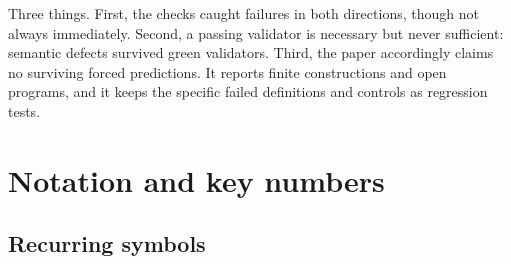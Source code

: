 \documentclass[11pt]{article}
\theoremstyle{definition}
\begin{document}
Three things. First, the checks caught failures in both directions, though not always immediately. Second, a passing
validator is necessary but never sufficient: semantic defects survived green validators. Third, the paper accordingly
claims no surviving forced predictions. It reports finite constructions and open programs, and it keeps the specific
failed definitions and controls as regression tests.
 \section{Notation and key numbers}\label{notation-the-six-primitives-at-a-glance}

\subsection{Recurring symbols}\label{recurring-symbols}
\end{document}
